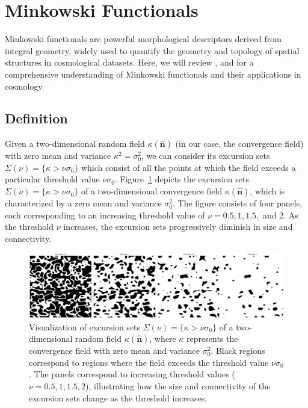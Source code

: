 \section{Minkowski Functionals}
\label{sec:minkowski_functionals}
Minkowski functionals are powerful morphological descriptors derived from integral geometry, widely used to quantify the geometry and topology of spatial structures in cosmological datasets. 
Here, we will review \citet{2010PhRvD..81h3505M}, \citet{2012PhRvD..85j3513K} and \citet{2013PhRvD..88l3002P} for a comprehensive understanding of Minkowski functionals and their applications in cosmology.

\subsection{Definition}
Given a two-dimensional random field $\kappa(\hat{\mathbf{n}})$ (in our case, the convergence field) with zero mean and variance $\kappa^2 = \sigma_0^2$, we can consider its excursion sets $\Sigma(\nu) = \{ \kappa > \nu \sigma_0 \}$ which consist of all the points at which the field exceeds a particular threshold value $\nu \sigma_0$. 
Figure~\ref{fig:excursion_sets} depicts the excursion sets $\Sigma(\nu) = \{ \kappa > \nu \sigma_0 \}$ of a two-dimensional convergence field $\kappa(\hat{\mathbf{n}})$, which is characterized by a zero mean and variance $\sigma_0^2$. The figure consists of four panels, each corresponding to an increasing threshold value of $\nu = 0.5, 1, 1.5,$ and $2$. As the threshold $\nu$ increases, the excursion sets progressively diminish in size and connectivity. 
\begin{figure}[ht]
    \centering
    \includegraphics[width=\textwidth]{figures/threshold_comparison.png}
    \caption{Visualization of excursion sets $\Sigma(\nu) = \{ \kappa > \nu \sigma_0 \}$ of a two-dimensional random field $\kappa(\hat{\mathbf{n}})$, where $\kappa$ represents the convergence field with zero mean and variance $\sigma_0^2$. 
    Black regions correspond to regions where the field exceeds the threshold value $\nu \sigma_0$. The panels correspond to increasing threshold values ($\nu = 0.5, 1, 1.5, 2$), illustrating how the size and connectivity of the excursion sets change as the threshold increases.}
    \label{fig:excursion_sets}
\end{figure}
